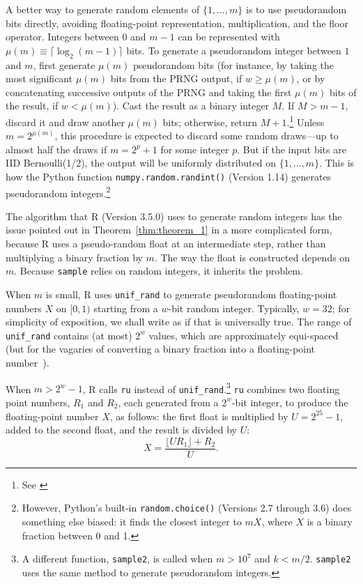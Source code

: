 \documentclass[12pt]{article}
\begin{document}
A better way to generate random elements of $\{1, \dots, m\}$ is to use pseudorandom bits directly,
avoiding floating-point representation, multiplication, and the floor operator. 
Integers between $0$ and $m-1$ can be represented with $\mu(m) \equiv \lceil \log_2(m-1) \rceil$ bits. 
To generate a pseudorandom integer between $1$ and $m$, first generate 
$\mu(m)$ pseudorandom bits (for instance, by taking the most significant $\mu(m)$ bits from the PRNG output, if $w \ge \mu(m)$, or by concatenating successive outputs of the PRNG and taking the
first $\mu(m)$ bits of the result, if $w < \mu(m)$).
Cast the result as a binary integer $M$.  
If $M > m-1$, discard it and draw another $\mu(m)$ bits; otherwise, return $M+1$.\footnote{%
   See \citet[p.114]{knuth_art_1997}
}
Unless $m = 2^{\mu(m)}$, this procedure is expected to discard some random draws---up to almost 
half the draws if $m = 2^p + 1$ for some integer $p$.
But if the input bits are IID Bernoulli(1/2), the output will be uniformly distributed on $\{1, \ldots, m\}$.
This is how the Python function \texttt{numpy.random.randint()} (Version 1.14) generates pseudorandom integers.\footnote{%
  However, Python's built-in \texttt{random.choice()} (Versions 2.7 through 3.6) does 
  something else biased: it finds the closest integer to $mX$, where $X$ is a binary fraction 
  between 0 and 1.
}

The algorithm that R (Version 3.5.0) \citep{R_2018} uses to generate random integers
has the issue pointed out in Theorem~\ref{thm:theorem_1} in a more complicated form, 
because R uses a pseudo-random float at an intermediate step, rather than multiplying a binary fraction
by $m$.
The way the float is constructed depends on $m$.
Because \texttt{sample} relies on random integers, it inherits the problem.

When $m$ is small, R uses \texttt{unif\_rand} to generate pseudorandom floating-point 
numbers $X$ on $[0, 1)$ starting from a $w$-bit random integer.
Typically, $w=32$; for simplicity of exposition, we shall write as if that is universally true.
The range of \texttt{unif\_rand} contains 
(at most) $2^w$ values, which are approximately equi-spaced (but for the vagaries of converting
a binary fraction into a floating-point number~\citep{goldberg91}).

When $m > 2^w-1$, R calls \texttt{ru} instead of \texttt{unif\_rand}.\footnote{
   A different function, \texttt{sample2}, is called when $m > 10^7$ and $k < m/2$.
\texttt{sample2} uses the same method to generate pseudorandom integers.
}
\texttt{ru} combines two floating point numbers, $R_1$ and $R_2$, each generated from a $2^w$-bit integer, 
to produce the floating-point number $X$, as follows:
the first float is multiplied by $U = 2^{25}-1$, added to the second float, and the result is divided by
$U$:
$$ X = \frac{\lfloor U R_1 \rfloor + R_2}{U}.$$
\end{document}
